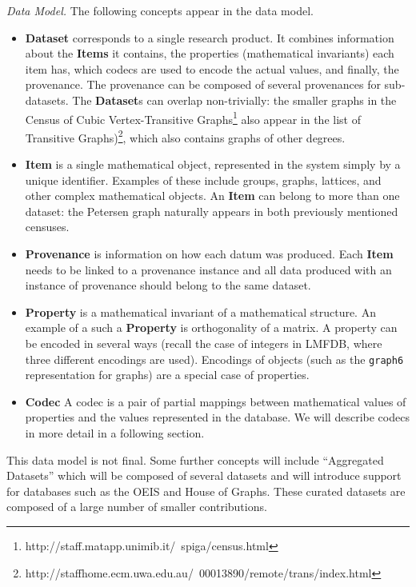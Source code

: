 \emph{\dmh Data Model.} The following concepts appear in the data model.
\begin{itemize}

\item \textbf{Dataset} corresponds to a single research product.
It combines information about the \textbf{Items} it contains,
the properties (mathematical invariants) each item has,
which codecs are used to encode the actual values,
and finally, the provenance.
The provenance can be composed of several provenances for sub-datasets.
The \textbf{Dataset}s can overlap non-trivially: 
the smaller graphs in the Census of Cubic Vertex-Transitive Graphs\footnote{http://staff.matapp.unimib.it/~spiga/census.html}
also appear in the list of Transitive Graphs)\footnote{http://staffhome.ecm.uwa.edu.au/~00013890/remote/trans/index.html},
which also contains graphs of other degrees.

\item \textbf{Item} is a single mathematical object, 
represented in the system simply by a unique identifier.
Examples of these include groups, graphs, lattices, and other complex mathematical objects.
An \textbf{Item} can belong to more than one dataset:
the Petersen graph naturally appears in both previously mentioned censuses.

\item \textbf{Provenance} is information on how each datum was produced.
Each \textbf{Item} needs to be linked to a provenance instance and 
all data produced with an instance of provenance should belong to the same dataset.

\item \textbf{Property} is a mathematical invariant of a mathematical structure.
An example of a such a \textbf{Property} is orthogonality of a matrix.
A property can be encoded in several ways
(recall the case of integers in LMFDB, where three different encodings are used).
Encodings of objects (such as the \texttt{graph6} representation for graphs)
are a special case of properties.

\item \textbf{Codec} A codec is a pair of partial mappings between 
mathematical values of properties and the values represented in the database.
We will describe codecs in more detail in a following section.

\end{itemize}
This data model is not final.
Some further concepts will include ``Aggregated Datasets'' which will be composed of several datasets and will
introduce support for databases such as the OEIS and House of Graphs.
These curated datasets are composed of a large number of smaller contributions.

